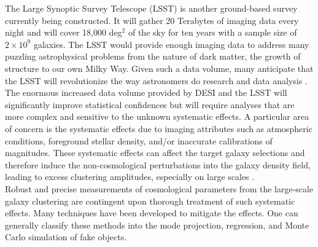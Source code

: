 \documentclass[fleqn, usenatbib]{mnras}
\begin{document}
The Large Synoptic Survey Telescope (LSST) is another ground-based survey currently being constructed. It will gather 20 Terabytes of imaging data every night and will cover 18,000 deg$^{2}$ of the sky for ten years with a sample size of $2\times 10^{9}$ galaxies. The LSST would provide enough imaging data to address many puzzling astrophysical problems from the nature of dark matter, the growth of structure to our own Milky Way. Given such a data volume, many anticipate that the LSST will  revolutionize the way astronomers do research and data analysis \citep{ivezic2008lsst, LSSTObservingStrategyWhitePaper}. \\

The enormous increased data volume provided by DESI and the LSST will significantly improve statistical confidences but will require analyses that are more complex and sensitive to the unknown systematic effects. A particular area of concern is the systematic effects due to imaging attributes such as atmospheric conditions, foreground stellar density, and/or inaccurate calibrations of magnitudes. These systematic effects can affect the target galaxy selections and therefore induce the non-cosmological perturbations into the galaxy density field, leading to excess clustering amplitudes, especially on large scales \citep[see e.g.][]{myers2007clustering,thomas2011angular,thomas2011excess, ross2011ameliorating, ashley2012MNRAS, 2012ApJ...761...14H, huterer2013calibration, pullen2013systematic}.\\ 


Robust and precise measurements of cosmological parameters  from  the large-scale  galaxy  clustering are  contingent  upon  thorough  treatment  of  such  systematic  effects. Many techniques have been developed to mitigate the effects. One can generally classify these  methods  into  the mode projection, regression,  and Monte Carlo simulation of fake objects.\\ 
\end{document}
